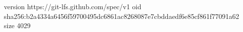 version https://git-lfs.github.com/spec/v1
oid sha256:b2a4334a6456f59700495dc6861ac8268087e7cbddaedf6e85cf861f77091a62
size 4029
